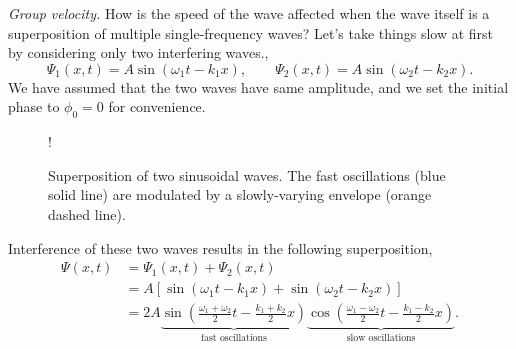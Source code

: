\emph{Group velocity.}
How is the speed of the wave affected when the wave itself is a superposition of multiple single-frequency waves?
Let's take things slow at first by considering only two interfering waves.,
\begin{equation}
    \Psi_1(x,t) = A \sin (\omega_1 t - k_1 x), \qquad \Psi_2(x,t) = A \sin (\omega_2 t - k_2 x).
\end{equation}
We have assumed that the two waves have same amplitude, and we set the initial phase to $\phi_0=0$ for convenience.
\begin{figure}[t]
    \centering
    \resizebox {0.9\textwidth} {!} {
    }   
    \caption[Group velocity.]{Superposition of two sinusoidal waves. The fast oscillations (blue solid line) are modulated by a slowly-varying envelope (orange dashed line).}
    \label{fig:6-2_superposition}
\end{figure}
Interference of these two waves results in the following superposition, 
\begin{align} 
    \Psi(x,t) & = \Psi_1(x,t) + \Psi_2(x,t) \nonumber\\
     & = A\left[\sin \left(\omega_{1} t-k_{1} x\right)+\sin \left(\omega_{2} t-k_{2} x\right)\right] \nonumber\\
    & = 2 A \underbrace{\sin \left( \frac{\omega_{1}+\omega_{2}}{2} t-\frac{k_{1}+k_{2}}{2} x \right)}_{\text{fast oscillations}} \underbrace{ \cos \left( \frac{\omega_{1}-\omega_{2}}{2} t-\frac{k_{1}-k_{2}}{2} x \right)}_{\text{slow oscillations}}.
    \label{eq:fast_slow_oscillations}
\end{align}
